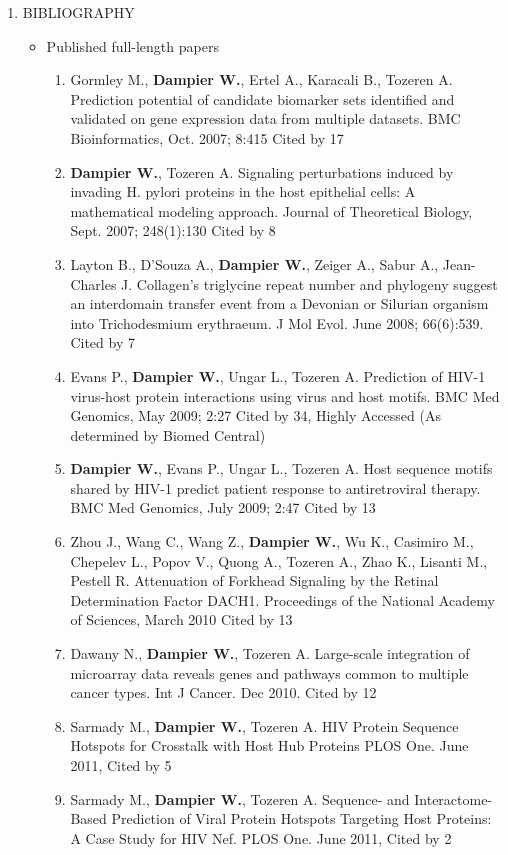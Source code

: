 \documentclass[a4paper,10pt]{article}
\begin{document}
\begin{enumerate}
 \item BIBLIOGRAPHY
 \begin{itemize}
  \item[] Published full-length papers
  \begin{enumerate}[label=\arabic{enumii}.]
   \item Gormley M., \textbf{Dampier W.}, Ertel A., Karacali B., Tozeren A. Prediction potential of candidate biomarker sets identified and validated on gene expression data from multiple datasets. BMC Bioinformatics, Oct. 2007; 8:415 Cited by 17
   \item \textbf{Dampier W.}, Tozeren A. Signaling perturbations induced by invading H. pylori proteins in the host epithelial cells: A mathematical modeling approach. Journal of Theoretical Biology, Sept. 2007; 248(1):130 Cited by 8
   \item Layton B., D'Souza A., \textbf{Dampier W.}, Zeiger A., Sabur A., Jean-Charles J. Collagen's triglycine repeat number and phylogeny suggest an interdomain transfer event from a Devonian or Silurian organism into Trichodesmium erythraeum. J Mol Evol. June 2008; 66(6):539. Cited by 7
   \item Evans P., \textbf{Dampier W.}, Ungar L., Tozeren A. Prediction of HIV-1 virus-host protein interactions using virus and host motifs. BMC Med Genomics, May 2009; 2:27 Cited by 34, Highly Accessed (As determined by Biomed Central)
   \item \textbf{Dampier W.}, Evans P., Ungar L., Tozeren A. Host sequence motifs shared by HIV-1 predict patient response to antiretroviral therapy. BMC Med Genomics, July 2009; 2:47 Cited by 13
   \item Zhou J., Wang C., Wang Z., \textbf{Dampier W.}, Wu K., Casimiro M., Chepelev L., Popov V., Quong A., Tozeren A., Zhao K., Lisanti M., Pestell R. Attenuation of Forkhead Signaling by the Retinal Determination Factor DACH1. Proceedings of the National Academy of Sciences, March 2010 Cited by 13
   \item Dawany N., \textbf{Dampier W.}, Tozeren A. Large-scale integration of microarray data reveals genes and pathways common to multiple cancer types. Int J Cancer. Dec 2010. Cited by 12
   \item Sarmady M., \textbf{Dampier W.}, Tozeren A. HIV Protein Sequence Hotspots for Crosstalk with Host Hub Proteins PLOS One. June 2011, Cited by 5
   \item Sarmady M., \textbf{Dampier W.}, Tozeren A. Sequence- and Interactome- Based Prediction of Viral Protein Hotspots Targeting Host Proteins: A Case Study for HIV Nef. PLOS One. June 2011, Cited by 2

\end{enumerate}
\end{itemize}
\end{enumerate}
\end{document}
